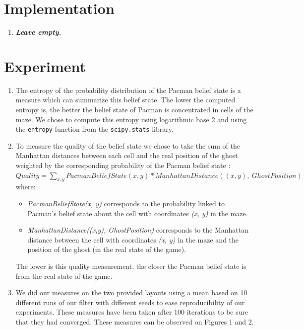 \documentclass{article}
\begin{document}
\section{Implementation}

\begin{enumerate}[label=\alph*.,leftmargin=*]
    \item \textbf{\textit{Leave empty.}}
\end{enumerate}

\section{Experiment}

\begin{enumerate}[label=\alph*.,leftmargin=*]
    \item The entropy of the probability distribution of the Pacman belief state is a measure which can summarize this belief state. 
    The lower the computed entropy is, the better the belief state of Pacman is concentrated in cells of the maze. We chose to compute this entropy using logarithmic base 2 and using the \texttt{entropy} function from the \texttt{scipy.stats} library.
    
    \item To measure the quality of the belief state we chose to take the sum of the Manhattan distances between each cell and the real position of the ghost weighted by the corresponding probability of the Pacman belief state :\\
    
    $Quality = {\sum_{x, y} {PacmanBeliefState(x, y) * ManhattanDistance((x, y), \ GhostPosition)}}$\\

    where:
    \begin{itemize}
    	\item \textit{PacmanBeliefState(x, y)} corresponds to the probability linked to Pacman's belief state about the cell with coordinates \textit{(x, y)} in the maze.
    	\item \textit{ManhattanDistance((x,y), GhostPosition)} corresponds to the Manhattan distance between the cell with coordinates \textit{(x, y)} in the maze and the position of the ghost (in the real state of the game).
	\end{itemize}        
     The lower is this quality measurement, the closer the Pacman belief state is from the real state of the game.
    \item We did our measures on the two provided layouts using a mean based on 10 different runs of our filter with different seeds to ease reproducibility of our experiments. These measures have been taken after 100 iterations to be sure that they had converged.
    These measures can be observed on Figures 1 and 2. 


\end{enumerate}
\end{document}
